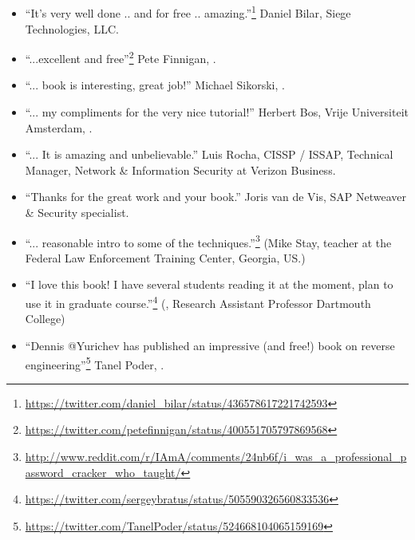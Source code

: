 \subsection*{ \IT{\TITLE}}

\begin{itemize}
\item ``It's very well done .. and for free .. amazing.''\footnote{\url{https://twitter.com/daniel_bilar/status/436578617221742593}} Daniel Bilar, Siege Technologies, LLC.

\item ``...excellent and free''\footnote{\url{https://twitter.com/petefinnigan/status/400551705797869568}} Pete Finnigan, \oracle{}.

\item ``... book is interesting, great job!'' Michael Sikorski,  .

\item ``... my compliments for the very nice tutorial!'' Herbert Bos,  Vrije Universiteit Amsterdam,  .

\item ``... It is amazing and unbelievable.'' Luis Rocha, CISSP / ISSAP, Technical Manager, Network \& Information Security at Verizon Business.

\item ``Thanks for the great work and your book.'' Joris van de Vis, SAP Netweaver \& Security specialist.

\item ``... reasonable intro to some of the techniques.''\footnote{\url{http://www.reddit.com/r/IAmA/comments/24nb6f/i_was_a_professional_password_cracker_who_taught/}} (Mike Stay, teacher at the Federal Law Enforcement Training Center, Georgia, US.)

\item ``I love this book! I have several students reading it at the moment, plan to use it in graduate course.''\footnote{\url{https://twitter.com/sergeybratus/status/505590326560833536}} (, Research Assistant Professor   Dartmouth College)

\item ``Dennis @Yurichev has published an impressive (and free!) book on reverse engineering''\footnote{\url{https://twitter.com/TanelPoder/status/524668104065159169}} Tanel Poder, .

\end{itemize}
